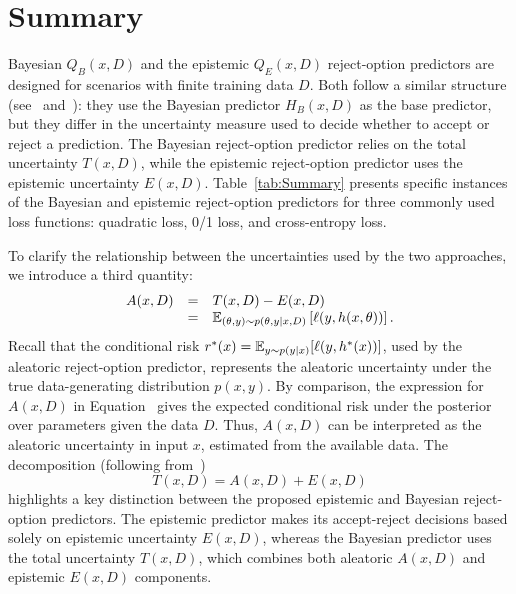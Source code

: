 \section{Summary}
\label{sec:summary}

%

Bayesian $Q_B(x,D)$ and the epistemic $Q_E(x,D)$ reject-option predictors are designed for scenarios with finite training data $D$. Both follow a similar structure (see~ and~): they use the Bayesian predictor $H_B(x,D)$ as the base predictor, but they differ in the uncertainty measure used to decide whether to accept or reject a prediction. The Bayesian reject-option predictor relies on the total uncertainty $T(x,D)$, while the epistemic reject-option predictor uses the epistemic uncertainty $E(x,D)$. Table~\ref{tab:Summary} presents specific instances of the Bayesian and epistemic reject-option predictors for three commonly used loss functions: quadratic loss, 0/1 loss, and cross-entropy loss. 

To clarify the relationship between the uncertainties used by the two approaches, we introduce a third quantity:
\begin{equation}
\label{equ:AleatorUncertainty}
\begin{array}{rcl}
A(x, D) & = & T(x, D) - E(x, D) \\
& = & {\mathbb{E}}_{(\theta, y) \sim p(\theta, y \mid x, D)} \left[\ell(y, h(x, \theta))\right].
\end{array}
\end{equation}
%
Recall that the conditional risk $r^*(x) = {\mathbb{E}}_{y \sim p(y \mid x)}[\ell(y, h^*(x))]$, 
used by the aleatoric reject-option predictor, represents the aleatoric uncertainty under the true data-generating distribution $p(x,y)$. By comparison, the expression for $A(x,D)$ in Equation~ gives the expected conditional risk under the posterior over parameters given the data $D$. Thus, $A(x,D)$ can be interpreted as the aleatoric uncertainty in input $x$, estimated from the available data. The decomposition (following from~)
\[ 
  T(x,D)=A(x,D)+E(x,D)
\]
%
highlights a key distinction between the proposed epistemic and Bayesian reject-option predictors. The epistemic predictor makes its accept-reject decisions based solely on epistemic uncertainty $E(x,D)$, whereas the Bayesian predictor uses the total uncertainty $T(x,D)$, which combines both aleatoric $A(x,D)$ and epistemic $E(x,D)$ components. 


